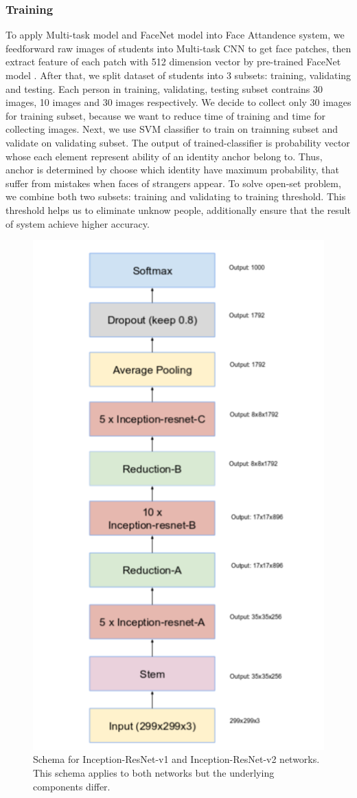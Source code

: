 \documentclass[journal, twocolumn]{IEEEtran}
\begin{document}
\subsubsection{Training} 
To apply Multi-task model and FaceNet model into Face Attandence system, we feedforward raw images of students into Multi-task CNN to get face patches, then extract feature of each patch with 512 dimension vector by pre-trained FaceNet model \cite{ref:facenet}. After that, we split dataset of students into 3 subsets: training, validating and testing. Each person in training, validating, testing subset contrains 30 images, 10 images and 30 images respectively. We decide to collect only 30 images for training subset, because we want to reduce time of training and time for collecting images. Next, we use SVM classifier to train on trainning subset and validate on validating subset. The output of trained-classifier is probability vector whose each element represent ability of an identity anchor belong to. Thus, anchor is determined by choose which identity have maximum probability, that suffer from mistakes when faces of strangers appear. To solve open-set problem, we combine both two subsets: training and validating to training threshold. This threshold helps us to eliminate unknow people, additionally ensure that the result of system achieve higher accuracy.
\begin{figure}
    \centering
    \includegraphics[width=0.7\linewidth]{img/in_res_v1.png}
	\caption{Schema for Inception-ResNet-v1 and Inception-ResNet-v2 networks. This schema applies to both networks but the underlying components differ.}
	\label{fig:inception-resnet}
\end{figure}
\end{document}
